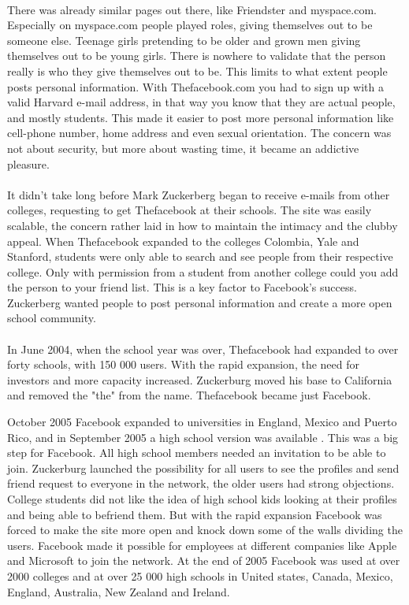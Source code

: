 \paragraph{}
There was already similar pages out there, like Friendster and myspace.com. Especially on myspace.com people played roles, giving themselves out to be someone else. Teenage girls pretending to be older and grown men giving themselves out to be young girls. There is nowhere to validate that the person really is who they give themselves out to be. This limits to what extent people posts personal information. With Thefacebook.com you had to sign up with a valid Harvard e-mail address, in that way you know that they are actual people, and mostly students. This made it easier to post more personal information like cell-phone number, home address and even sexual orientation. The concern was not about security, but more about wasting time, it became an addictive pleasure. 

\paragraph{}
It didn't take long before Mark Zuckerberg began to receive e-mails from other colleges, requesting to get Thefacebook at their schools. The site was easily scalable, the concern rather laid in how to maintain the intimacy and the clubby appeal. When Thefacebook expanded to the colleges Colombia, Yale and Stanford, students were only able to search and see people from their respective college. Only with permission from a student from another college could you add the person to your friend list. This is a key factor to Facebook's success. Zuckerberg wanted people to post personal information and create a more open school community.

\paragraph{}
In June 2004, when the school year was over, Thefacebook had expanded to over forty schools, with 150 000 users. With the rapid expansion, the need for investors and more capacity increased. Zuckerburg moved his base to California and removed the "the" from the name. Thefacebook became just Facebook.

October 2005 Facebook expanded to universities in England, Mexico and Puerto Rico, and in September 2005 a high school version was available \cite{FacebookHistory}. This was a big step for Facebook. All high school members needed an invitation to be able to join. Zuckerburg launched the possibility for all users to see the profiles and send friend request to everyone in the network, the older users had strong objections. College students did not like the idea of high school kids looking at their profiles and being able to befriend them. But with the rapid expansion Facebook was forced to make the site more open and knock down some of the walls dividing the users. Facebook made it possible for employees at different companies like Apple and Microsoft to join the network. 
At the end of 2005 Facebook was used at over 2000 colleges and at over 25 000 high schools in United states, Canada, Mexico, England, Australia, New Zealand and Ireland. 

